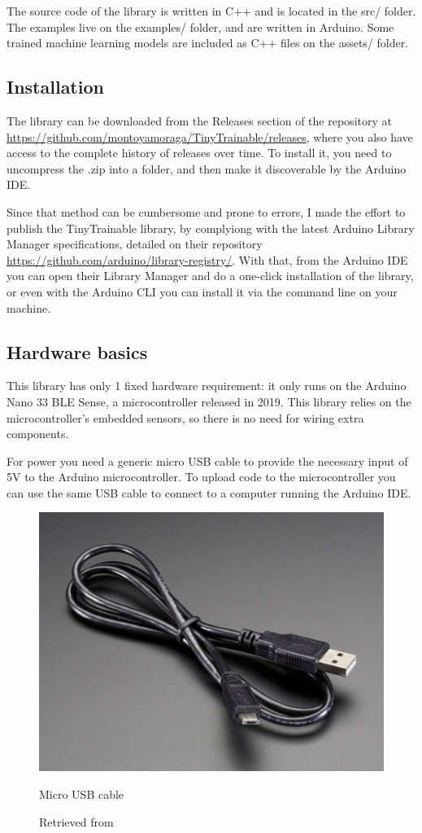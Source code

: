 The source code of the library is written in C++ and is located in the src/ folder. The examples live on the examples/ folder, and are written in Arduino. Some trained machine learning models are included as C++ files on the assets/ folder.

\subsection{Installation}

The library can be downloaded from the Releases section of the repository at  \url{https://github.com/montoyamoraga/TinyTrainable/releases}, where you also have access to the complete history of releases over time. To install it, you need to uncompress the .zip into a folder, and then make it discoverable by the Arduino IDE.

Since that method can be cumbersome and prone to errors, I made the effort to publish the TinyTrainable library, by complyiong with the latest Arduino Library Manager specifications, detailed on their repository \url{https://github.com/arduino/library-registry/}. With that, from the Arduino IDE you can open their Library Manager and do a one-click installation of the library, or even with the Arduino CLI you can install it via the command line on your machine.

\subsection{Hardware basics}

This library has only 1 fixed hardware requirement: it only runs on the Arduino Nano 33 BLE Sense, a microcontroller released in 2019. This library relies on the microcontroller's embedded sensors, so there is no need for wiring extra components.

For power you need a generic micro USB cable to provide the necessary input of 5V to the Arduino microcontroller. To upload code to the microcontroller you can use the same USB cable to connect to a computer running the Arduino IDE.

\begin{figure}[ht]
  \centering
  \includegraphics[width=0.75\linewidth,height=0.25\textheight,keepaspectratio]{images/materials-adafruit-micro-usb-cable.jpg}
  \caption{Micro USB cable}
  \caption*{Retrieved from \cite{website-materials-adafruit-micro-usb-cable}}
  \label{fig:materials-adafruit-usb-cable}
\end{figure}

